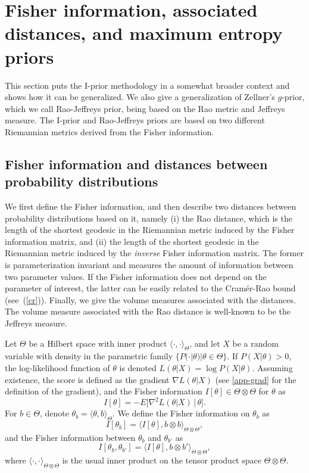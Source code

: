 \documentclass[preprint,12pt,authoryear]{elsarticle}
\begin{document}
\section{Fisher information, associated distances, and maximum entropy priors}\label{app-fish}

This section puts the I-prior methodology in a somewhat broader context and shows how it can be generalized. We also give a generalization of Zellner's $g$-prior, which we call Rao-Jeffreys prior, being based on the Rao metric and Jeffreys measure. The I-prior and Rao-Jeffreys priors are based on two different Riemannian metrics derived from the Fisher information. 


\subsection{Fisher information and distances between probability distributions}\label{app-fishdist}

We first define the Fisher information, and then describe two distances between probability distributions based on it, namely (i) the Rao distance, which is the length of the shortest geodesic in the Riemannian metric induced by the Fisher information matrix, and (ii) the length of the shortest geodesic in the Riemannian metric induced by the {\em inverse} Fisher information matrix. 
The former is parameterization invariant and measures the amount of information between two parameter values.
If the Fisher information does not depend on the parameter of interest, the latter can be easily related to the Cram\'er-Rao bound (see~(\ref{cr})).
Finally, we give the volume measures associated with the distances. The volume measure associated with the Rao distance is well-known to be the Jeffreys measure.


Let $\Theta$ be a Hilbert space with inner product $\langle\cdot,\cdot\rangle_\Theta$, and let $X$ be a random variable with density in the parametric family $\{P(\cdot|\theta)|\theta\in\Theta\}$.
If $P(X|\theta)>0$, the log-likelihood function of $\theta$ is denoted $L(\theta|X)=\log P(X|\theta)$.
Assuming existence, the score is defined as the gradient $\nabla L(\theta|X)$ (see \ref{app-grad} for the definition of the gradient), and the Fisher information $I[\theta]\in\Theta\otimes\Theta$ for $\theta$ as
\[  I[\theta] = -E\big[\nabla^2 L(\theta|X)\,\big|\,\theta\big]. \]
For $b\in\Theta$, denote $\theta_b=\langle\theta,b\rangle_\Theta$.
We define the Fisher information on $\theta_b$ as
\[  I[\theta_b] = \big\langle I[\theta],b\otimes b \big\rangle_{\Theta\otimes\Theta}, \]
and the Fisher information between $\theta_b$ and $\theta_{b'}$ as
\[  I[\theta_b,\theta_{b'}] = \big\langle I[\theta],b\otimes b' \big\rangle_{\Theta\otimes\Theta}, \]
where $\langle\cdot,\cdot\rangle_{\Theta\otimes\Theta}$ is the usual inner product on the tensor product space $\Theta\otimes\Theta$.
\end{document}
